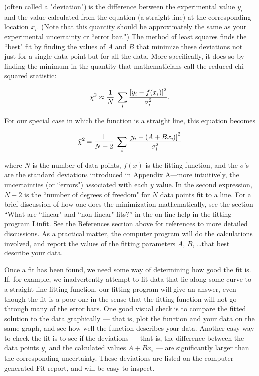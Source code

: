 (often called a "deviation") is the difference between the
experimental value $y_i$ and the value calculated from the equation 
(a
straight line) at the corresponding location $x_i$.  (Note that
this quantity should be approximately the same as your experimental
uncertainty or ``error bar.") The method of least squares finds the
``best" fit by finding the values of $A$ and $B$ that minimize these
deviations not just for a single data point but for all the
data.  More specifically, it does so by finding the minimum in the
quantity that mathematicians call the reduced chi-squared statistic:


\begin{equation}
\bar{\chi}^{2} \approx {{1} \over {N}} \; \sum_{i} {{\left[y_{i} -
         f(x_{i})\right]^{2}} \over {\sigma_{i}^{2}}} .
         \label{eq:chisq}
\end{equation}

For our special case in which the function is a straight line, this
equation becomes

\[
\bar{\chi}^{2}= {{1} \over {N-2}} \; \sum_{i} {{\left[y_{i} -
         (A + Bx_{i})\right]^{2}} \over {\sigma_{i}^{2}}}
\]

where $N$ is the number of data points, $f(x)$ is the fitting
function,
and the $\sigma$'s are the standard deviations introduced in Appendix
A---more intuitively, the uncertainties (or ``errors") associated
with
each $y$ value.  In the second expression, $N-2$ is the 
``number of degrees of freedom" for $N$ data points fit to a line.
For a brief discussion of how one does the minimization
mathematically,
see the section ``What are ``linear" and ``non-linear" fits?'' in the
on-line help in the fitting program Linfit.  See
the References section above for references to more detailed
discussions.  As a practical matter, the computer program will do the
calculations involved, and report the values of the fitting parameters
$A$, $B$, \ldots that best describe your data.

Once a fit has been found, we need some way of determining
how good the fit is.  If, for example, we inadvertently attempt
to fit data that lie along some curve to a straight line
fitting function, our fitting program will give an answer, even though
the fit is a poor one in the sense that the fitting function
will not go through many of the error bars.
One good visual check is to compare the fitted
solution to the data graphically --- that is, plot the function and
your data on the same graph, and see how well the function
describes your data.  Another easy way to check the fit is to see
if the deviations --- that is, the difference between the data
points $y_{i}$ and the calculated values $A + Bx_{i}$ --- are significantly
larger than the corresponding uncertainty.  These deviations are listed on the 
computer-generated Fit report,
and will be easy to inspect.

